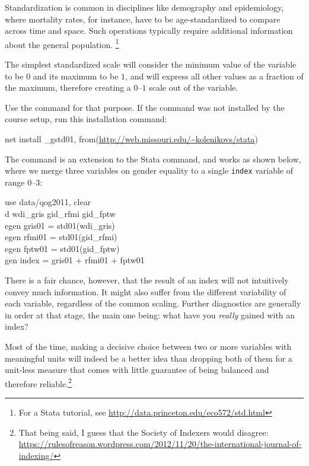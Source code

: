 Standardization is common in disciplines like demography and epidemiology, where mortality rates, for instance, have to be age-standardized to compare across time and space. Such operations typically require additional information about the general population.%
  \footnote{For a Stata tutorial, see \url{http://data.princeton.edu/eco572/std.html}}

The simplest standardized scale will consider the minimum value of the variable to be $0$ and its maximum to be $1$, and will express all other values as a fraction of the maximum, therefore creating a $0$--$1$ scale out of the variable.

\label{sec:gtsd01}%
Use the  command for that purpose. If the command was not installed by the course setup, run this installation command:%
	
  \begin{fullwidth}
	  \begin{docspec}
		  net install \_gstd01,%
			  from(\url{http://web.missouri.edu/~kolenikovs/stata})
	  \end{docspec}  
  \end{fullwidth}
	
The command is an extension to the Stata  command, and works as shown below, where we merge three \QOG variables on gender equality to a single \texttt{index} variable of range $0$--$3$:%

\begin{docspec}
	use data/qog2011, clear\\
	d wdi\_gris gid\_rfmi gid\_fptw\\
	egen gris01 = std01(wdi\_gris)\\
	egen rfmi01 = std01(gid\_rfmi)\\
	egen fptw01 = std01(gid\_fptw)\\
	gen index = gris01 + rfmi01 + fptw01
\end{docspec}

There is a fair chance, however, that the result of an index will not intuitively convey much information. It might also suffer from the different variability of each variable, regardless of the common scaling. Further diagnostics are generally in order at that stage, the main one being: what have you \emph{really} gained with an index?

Most of the time, making a decisive choice between two or more variables with meaningful units will indeed be a better idea than dropping both of them for a unit-less measure that comes with little guarantee of being balanced and therefore reliable.\footnote{That being said, I guess that the Society of Indexers would disagree: \url{https://rulesofreason.wordpress.com/2012/11/20/the-international-journal-of-indexing/}}